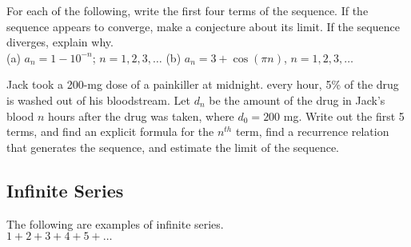 \documentclass[12pt]{article}
\begin{document}
\vfill

\newpage


\vspace{20mm}

\Example For each of the following, write the first four terms of the sequence. If the sequence appears to converge, make a conjecture about its limit. If the sequence diverges, explain why.\\

(a) $a_n=1-10^{-n}$; $n=1,2,3,\dots$ \hspace{25mm} (b) $a_n=3+\cos\left(\pi n\right)$, $n=1,2,3,\dots$

\vspace{45mm}

\Example Jack took a 200-mg dose of a painkiller at midnight. every hour, 5\% of the drug is washed out of his bloodstream. Let $d_n$ be the amount of the drug in Jack's blood $n$ hours after the drug was taken, where $d_0=200$ mg. Write out the first 5 terms, and find an explicit formula for the $n^{th}$ term, find a recurrence relation that generates the sequence, and estimate the limit of the sequence.

\newpage

\subsection*{Infinite Series}


\vspace{5mm}

\Examples The following are examples of infinite series.\\

\hspace{5mm} $1+2+3+4+5+\dots$
\end{document}
